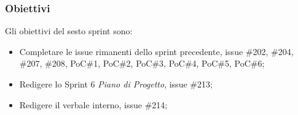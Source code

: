 \subsubsection{Obiettivi}
\label{sec:sprint6_obiettivi}
Gli obiettivi del sesto sprint sono:
\begin{itemize}
    \item Completare le issue rimanenti dello sprint precedente, issue \#202, \#204, \#207, \#208, PoC\#1, PoC\#2, PoC\#3, PoC\#4, PoC\#5, PoC\#6;
    \item Redigere lo Sprint 6 \textit{Piano di Progetto}, issue \#213;
    \item Redigere il verbale interno, issue \#214;
\end{itemize}